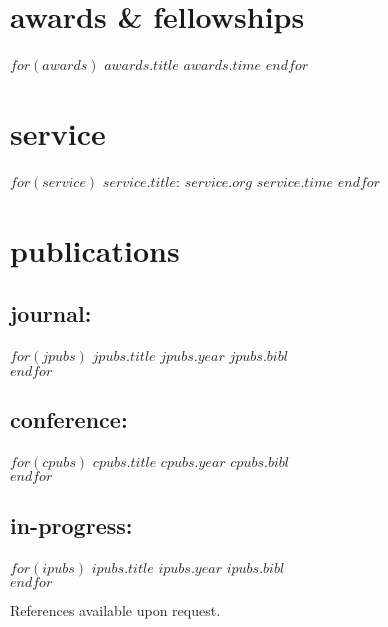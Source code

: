 \documentclass[]{friggeri-cv}
\begin{document}
\section{awards \& fellowships}
\begin{itemize}[noitemsep, leftmargin=0.55in]
$for(awards)$
  \entryitem
  {$awards.title$}
  {$awards.time$}
$endfor$
\end{itemize}



\vspace{-0.05in}
\section{service}
\begin{itemize}[noitemsep, leftmargin=0.55in]
$for(service)$
  \entryitem
  {$service.title$: $service.org$}
  {$service.time$}
$endfor$
\end{itemize}



\section{publications}

\vspace{-0.05in}
\subsection{journal:}
\begin{entrylist}
$for(jpubs)$
  \entrypub
  {$jpubs.title$}
  {$jpubs.year$}
  {$jpubs.bibl$}\\
$endfor$
\end{entrylist}

\vspace{-0.15in}
\subsection{conference:}
\begin{entrylist}
$for(cpubs)$
  \entrypub
  {$cpubs.title$}
  {$cpubs.year$}
  {$cpubs.bibl$}\\
$endfor$
\end{entrylist}

\vspace{-0.15in}
\subsection{in-progress:}
\begin{entrylist}
$for(ipubs)$
  \entrypub
  {$ipubs.title$}
  {$ipubs.year$}
  {$ipubs.bibl$}\\
$endfor$
\end{entrylist}






\vspace{0.1in}
References available upon request.
\end{document}
